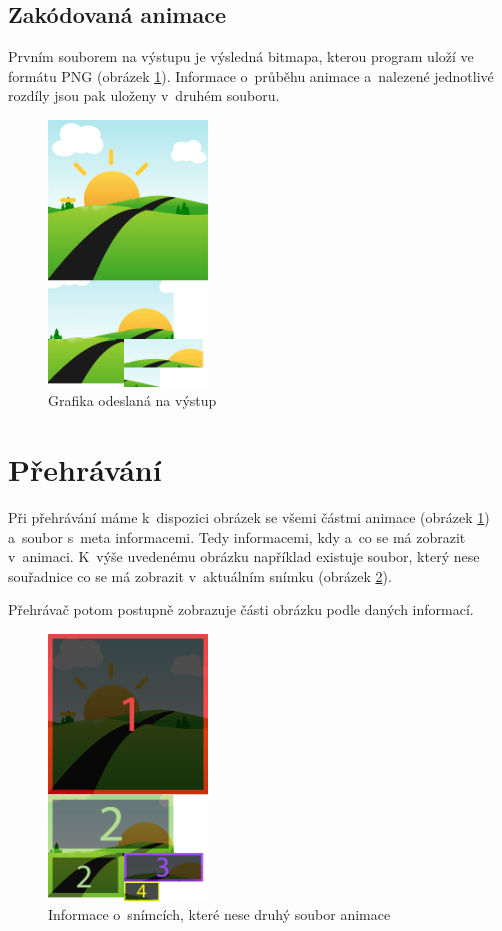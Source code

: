 \subsection{Zakódovaná animace}

Prvním souborem na výstupu je výsledná bitmapa, kterou program uloží ve formátu PNG (obrázek \ref{fig:algresult}). Informace o~průběhu animace a~nalezené jednotlivé rozdíly jsou pak uloženy v~druhém souboru.

\begin{figure}[h]
\centering
\includegraphics[height=200pt]{figures/alg-result.png}
\caption{Grafika odeslaná na výstup}
\label{fig:algresult}
\end{figure}


\section{Přehrávání}

Při přehrávání máme k~dispozici obrázek se všemi částmi animace (obrázek \ref{fig:algresult}) a~soubor s~meta informacemi. Tedy informacemi, kdy a~co se má zobrazit v~animaci. K~výše uvedenému obrázku například existuje soubor, který nese souřadnice co se má zobrazit v~aktuálním snímku (obrázek \ref{fig:algmetadata}).

Přehrávač potom postupně zobrazuje části obrázku podle daných informací. 

\begin{figure}[h]
\centering
\includegraphics[height=200pt]{figures/alg-metadata.png}
\caption{Informace o~snímcích, které nese druhý soubor animace}
\label{fig:algmetadata}
\end{figure}



